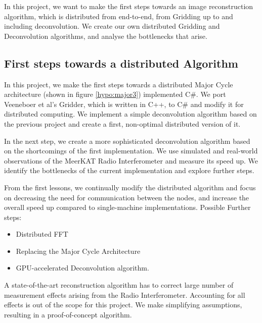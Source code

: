 In this project, we want to make the first steps towards an image reconstruction algorithm, which is distributed from end-to-end, from Gridding up to and including deconvolution. We create our own distributed Gridding and Deconvolution algorithms, and analyse the bottlenecks that arise.

\subsection{First steps towards a distributed Algorithm}
In this project, we make the first steps towards a distributed Major Cycle architecture (shown in figure \ref{hypo:major3}) implemented C\#. We port Veeneboer et al's Gridder, which is written in C++, to C\# and modify it for distributed computing. We implement a simple deconvolution algorithm based on the previous project and create a first, non-optimal distributed version of it.

In the next step, we create a more sophisticated deconvolution algorithm based on the shortcomings of the first implementation. We use simulated and real-world observations of the MeerKAT Radio Interferometer and measure its speed up. We identify the bottlenecks of the current implementation and explore further steps.

From the first lessons, we continually modify the distributed algorithm and focus on decreasing the need for communication between the nodes, and increase the overall speed up compared to single-machine implementations. Possible Further steps:
\begin{itemize}
	\item Distributed FFT
	\item Replacing the Major Cycle Architecture
	\item GPU-accelerated Deconvolution algorithm.
\end{itemize}

A state-of-the-art reconstruction algorithm has to correct large number of measurement effects arising from the Radio Interferometer. Accounting for all effects is out of the scope for this project. We make simplifying assumptions, resulting in a proof-of-concept algorithm.